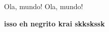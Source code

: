 \def\ola{Ola, mundo!}
\ola
\ola

\def\negrito#1{ {\bf #1} }
\negrito{isso eh negrito krai skkskssk}
